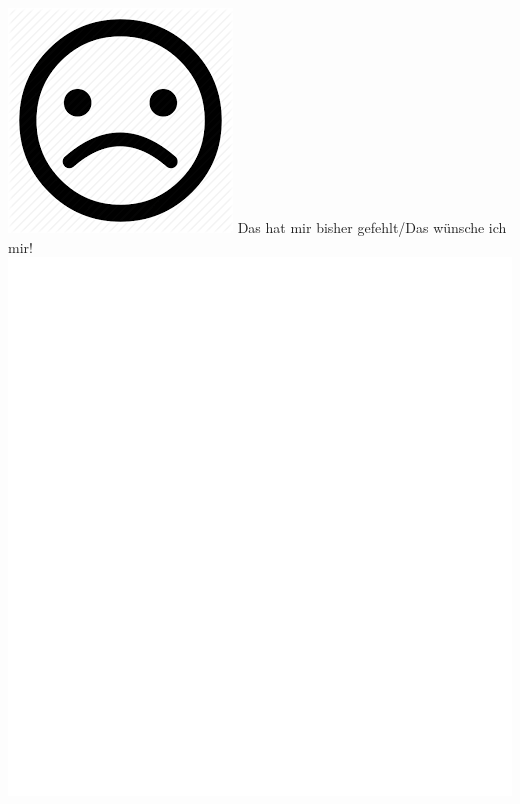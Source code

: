 \documentclass[oneside,openany,headings=optiontotoc,11pt,numbers=noenddot]{scrreprt}
\begin{document}
	\begin{framed}
		\noindent
		\includegraphics[scale=0.1]{ssmi.png} \tiny{\color{codegray}Das hat mir bisher gefehlt/Das wünsche ich mir!}\\
		\includegraphics[scale=0.15]{empty.jpg}
	\end{framed}
\end{document}
